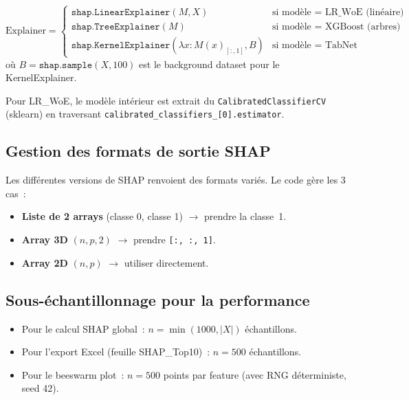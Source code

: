 \documentclass[12pt,a4paper]{article}
\begin{document}
\begin{formulebox}
\[
\text{Explainer} = \begin{cases}
    \texttt{shap.LinearExplainer}(M, X) & \text{si mod\`ele = LR\_WoE (lin\'eaire)} \\
    \texttt{shap.TreeExplainer}(M) & \text{si mod\`ele = XGBoost (arbres)} \\
    \texttt{shap.KernelExplainer}(\lambda x: M(x)_{[:,1]}, B) & \text{si mod\`ele = TabNet (agnostique)}
\end{cases}
\]
o\`u $B = \texttt{shap.sample}(X, 100)$ est le background dataset pour le KernelExplainer.
\end{formulebox}

Pour LR\_WoE, le mod\`ele int\'erieur est extrait du \texttt{CalibratedClassifierCV} (sklearn) en traversant \texttt{calibrated\_classifiers\_[0].estimator}.

\subsection{Gestion des formats de sortie SHAP}

Les diff\'erentes versions de SHAP renvoient des formats vari\'es. Le code g\`ere les 3 cas~:
\begin{itemize}[leftmargin=2em]
    \item \textbf{Liste de 2 arrays} (classe 0, classe 1) $\to$ prendre la classe~1.
    \item \textbf{Array 3D} $(n, p, 2)$ $\to$ prendre \texttt{[:, :, 1]}.
    \item \textbf{Array 2D} $(n, p)$ $\to$ utiliser directement.
\end{itemize}

\subsection{Sous-\'echantillonnage pour la performance}

\begin{itemize}[leftmargin=2em]
    \item Pour le calcul SHAP global~: $n = \min(1000, |X|)$ \'echantillons.
    \item Pour l'export Excel (feuille SHAP\_Top10)~: $n = 500$ \'echantillons.
    \item Pour le beeswarm plot~: $n = 500$ points par feature (avec RNG d\'eterministe, seed 42).
\end{itemize}
\end{document}
